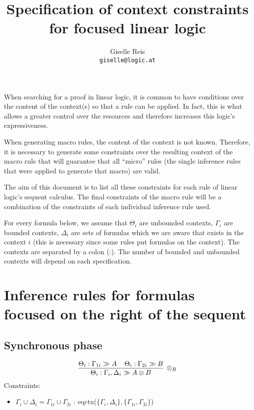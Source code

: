 \documentclass[a4paper, 11pt]{article}
\title{Specification of context constraints for focused linear logic}
\author{Giselle Reis \\ \texttt{giselle@logic.at}}
\begin{document}
\maketitle

When searching for a proof in linear logic, it is common to have conditions over
the content of the context(s) so that a rule can be applied. In fact, this is
what allows a greater control over the resources and therefore increases this
logic's expressiveness.

When generating macro rules, the content of the context is not known. Therefore,
it is necessary to generate some constraints over the resulting context of the
macro rule that will guarantee that all ``micro'' rules (the single inference
rules that were applied to generate that macro) are valid.

The aim of this document is to list all these constraints for each rule of
linear logic's sequent calculus. The final constraints of the macro rule will be
a combination of the constraints of each individual inference rule used.

For every formula below, we assume that $\Theta_i$ are unbounded contexts,
$\Gamma_i$ are bounded contexts, $\Delta_i$ are sets of formulas which we are
aware that exists in the context $i$ (this is necessary since some rules put 
formulas on the context). The contexts are separated by a colon (:). The number
of bounded and unbounded contexts will depend on each specification. 

\section*{Inference rules for formulas focused on the right of the sequent}

\subsection*{Synchronous phase}

$$
\infer[\otimes_R]{\Theta_i : \Gamma_i, \Delta_i \gg A \otimes B}
{
    \Theta_i : \Gamma_{1i} \gg A \;\;\;\;
    \Theta_i : \Gamma_{2i} \gg B
}
$$
Constraints:
\begin{itemize}
    \item $\Gamma_i \cup \Delta_i = \Gamma_{1i} \cup \Gamma_{2i}$ :  
    eqctx($\{\Gamma_i, \Delta_i\}, \{\Gamma_{1i}, \Gamma_{2i}\}$)
\end{itemize}
\end{document}
